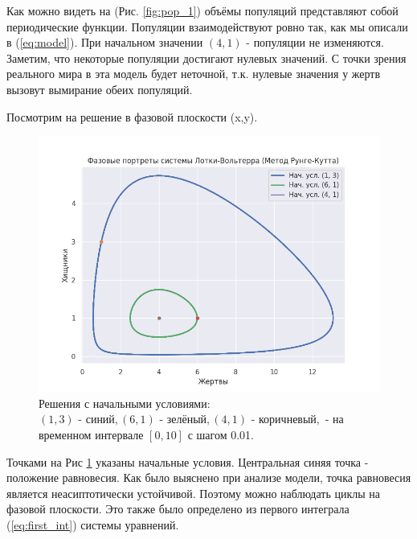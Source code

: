 Как можно видеть на (Рис. \ref{fig:pop_1}) объёмы популяций представляют собой периодические функции. Популяции взаимодействуют ровно так, как мы описали в (\ref{eq:model}). При начальном значении $(4,1)$ - популяции не изменяются.
Заметим, что некоторые популяции достигают нулевых значений. С точки зрения реального мира в эта модель будет неточной, т.к. нулевые значения у жертв вызовут вымирание обеих популяций.

Посмотрим на решение в фазовой плоскости (x,y).
\begin{figure}[h]  %
	\centering
	\includegraphics[width=1\textwidth]{imgs/phase_1.png}  %
	\caption{Решения с начальными условиями: $(1,3)\text{ - синий}, (6,1)\text{ - зелёный}, (4,1)\text{ - коричневый}, $ - на временном интервале $[0,10]$ с шагом 0.01.}  %
	\label{fig:phase_1}  %
\end{figure}

Точками на Рис \ref{fig:phase_1} указаны начальные условия. Центральная синяя точка - положение равновесия. Как было выяснено при анализе модели, точка равновесия является неасиптотически устойчивой. Поэтому можно наблюдать циклы на фазовой плоскости. Это также было определено из первого интеграла (\ref{eq:first_int}) системы уравнений.

